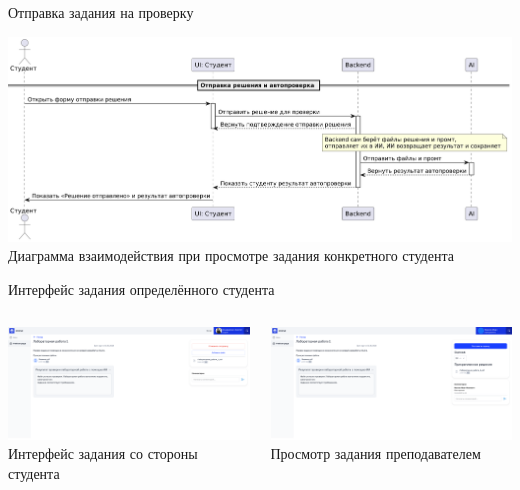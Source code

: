 \documentclass[aspectratio=169]{beamer}
\begin{document}
\begin{frame}{Отправка задания на проверку}
\vspace{0.5em}

\centering
\includegraphics[width=0.75\linewidth]{static/TaskSendStudentDiagram.png} \\
\small Диаграмма взаимодействия при просмотре задания конкретного студента
\end{frame}

\begin{frame}{Интерфейс задания определённого студента}
\vspace{0.5em}

\begin{columns}
    \begin{column}{0.5\textwidth}
        \centering
        \includegraphics[width=0.95\linewidth]{static/TaskStudentSend.png} \\
        \small Интерфейс задания со стороны студента
    \end{column}
    \begin{column}{0.5\textwidth}
        \centering
        \includegraphics[width=0.95\linewidth]{static/TaskTeacherDetailByStudent.png} \\
        \small Просмотр задания преподавателем
    \end{column}
\end{columns}
\end{frame}
\end{document}
